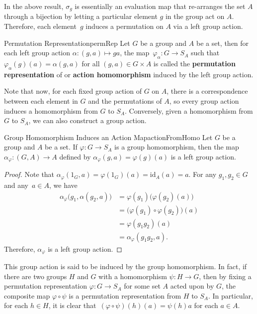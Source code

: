\documentclass[math]{amznotes}
\theoremstyle{remark}
\newcommand{\0}{\mathbf{0}}
\newcommand{\1}{\mathbf{1}}
\begin{document}
In the above result, $\sigma_g$ is essentially an evaluation map that re-arranges the set $A$ through a bijection by letting a particular element $g$ in the group act on $A$. Therefore, each element~$g$ induces a permutation on $A$ via a left group action.
\begin{dfnbox}{Permutation Representation}{permRep}
    Let $G$ be a group and $A$ be a set, then for each left group action $\alpha \colon \left(g, a\right) \mapsto ga$, the map~$\varphi_{\alpha} \colon G \to S_A$ such that $\varphi_{\alpha}\left(g\right)\left(a\right) = \alpha\left(g, a\right)$ for all $\left(g, a\right) \in G \times A$ is called the {\color{red} \textbf{permutation representation}} of or {\color{red} \textbf{action homomorphism}} induced by the left group action.
\end{dfnbox}
Note that now, for each fixed group action of $G$ on $A$, there is a correspondence between each element in $G$ and the permutations of $A$, so every group action induces a homomorphism from $G$ to $S_A$. Conversely, given a homomorphism from $G$ to $S_A$, we can also construct a group action. 
\begin{probox}{Group Homomorphism Induces an Action Map}{actionFromHomo}
    Let $G$ be a group and $A$ be a set. If $\varphi \colon G \to S_A$ is a group homomorphism, then the map~$\alpha_{\varphi} \colon \left(G, A\right) \to A$ defined by $\alpha_{\varphi}\left(g, a\right) = \varphi\left(g\right)\left(a\right)$ is a left group action.
    \tcblower
    \begin{proof}
        Note that $\alpha_{\varphi}\left(1_G, a\right) = \varphi\left(1_G\right)\left(a\right) = \mathrm{id}_A\left(a\right) = a$. For any $g_1, g_2 \in G$ and any~$a \in A$, we have 
        \begin{align*}
            \alpha_{\varphi}\bigl(g_1, \alpha\left(g_2, a\right)\bigr) & = \varphi\left(g_1\right)\bigl(\varphi\left(g_2\right)\left(a\right)\bigr) \\
            & = \bigl(\varphi\left(g_1\right) \circ \varphi\left(g_2\right)\bigr)\left(a\right) \\
            & = \varphi\left(g_1g_2\right)\left(a\right) \\
            & = \alpha_{\varphi}\left(g_1g_2, a\right).
        \end{align*}
        Therefore, $\alpha_{\varphi}$ is a left group action.
    \end{proof}
\end{probox}
This group action is said to be induced by the group homomorphism. In fact, if there are two groups $H$ and $G$ with a homomorphism $\psi \colon H \to G$, then by fixing a permutation representation $\varphi \colon G \to S_A$ for some set $A$ acted upon by $G$, the composite map $\varphi \circ \psi$ is a permutation representation from $H$ to $S_A$. In particular, for each $h \in H$, it is clear that~$\left(\varphi \circ \psi\right)\left(h\right)\left(a\right) = \psi\left(h\right)a$ for each $a \in A$.
\end{document}
